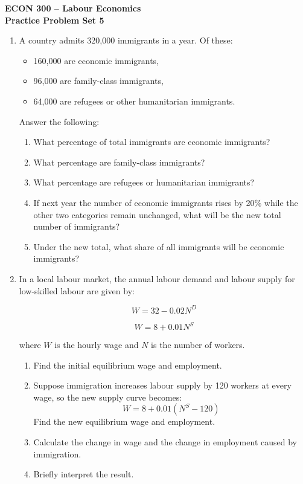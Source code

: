 \documentclass[12pt]{article}
\begin{document}
\begin{center}
\Large \textbf{ECON 300 -- Labour Economics} \\[0.7em]
\large \textbf{Practice Problem Set 5}\\[0.3em]

\end{center}

\vspace{1em}


\begin{enumerate}[label=\textbf{Question \arabic*.}]

\item A country admits 320{,}000 immigrants in a year. Of these:
\begin{itemize}
    \item 160{,}000 are economic immigrants,
    \item 96{,}000 are family-class immigrants,
    \item 64{,}000 are refugees or other humanitarian immigrants.
\end{itemize}

Answer the following:
\begin{enumerate}[label=(\alph*)]
    \item What percentage of total immigrants are economic immigrants?
    \item What percentage are family-class immigrants?
    \item What percentage are refugees or humanitarian immigrants?
    \item If next year the number of economic immigrants rises by 20\% while the other two categories remain unchanged, what will be the new total number of immigrants?
    \item Under the new total, what share of all immigrants will be economic immigrants?
\end{enumerate}

\item In a local labour market, the annual labour demand and labour supply for low-skilled labour are given by:

\[
W = 32 - 0.02N^D
\]

\[
W = 8 + 0.01N^S
\]

where \(W\) is the hourly wage and \(N\) is the number of workers.

\begin{enumerate}[label=(\alph*)]
    \item Find the initial equilibrium wage and employment.
    \item Suppose immigration increases labour supply by 120 workers at every wage, so the new supply curve becomes:
    \[
    W = 8 + 0.01(N^S - 120)
    \]
    Find the new equilibrium wage and employment.
    \item Calculate the change in wage and the change in employment caused by immigration.
    \item Briefly interpret the result.
\end{enumerate}


\end{enumerate}
\end{document}
